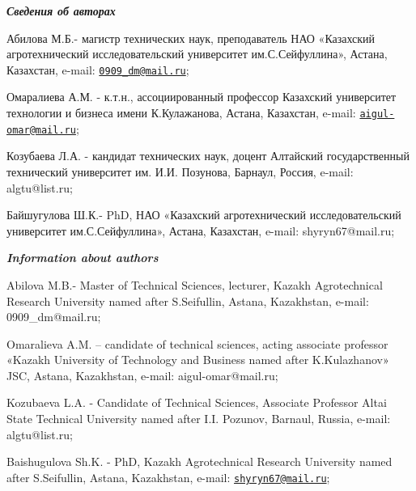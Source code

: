 \emph{{\bfseries Сведения об авторах}}

Абилова М.Б.- магистр технических наук, преподаватель НАО «Казахский
агротехнический исследовательский университет им.С.Сейфуллина», Астана,
Казахстан, e-mail:
\href{mailto:0909_dm@mail.ru}{\nolinkurl{0909\_dm@mail.ru}};

Омаралиева А.М. - к.т.н., ассоциированный профессор Казахский
университет технологии и бизнеса имени К.Кулажанова, Астана, Казахстан,
e-mail:
\href{mailto:aigul-omar@mail.ru}{\nolinkurl{aigul-omar@mail.ru}};

Козубаева Л.А. - кандидат технических наук, доцент Алтайский
государственный технический университет им. И.И. Позунова, Барнаул,
Россия, e-mail: algtu@list.ru;

Байшугулова Ш.К.- PhD, НАО «Казахский агротехнический исследовательский
университет им.С.Сейфуллина», Астана, Казахстан, e-mail:
shyryn67@mail.ru;

\emph{{\bfseries Information about authors}}

Abilova M.B.- Master of Technical Sciences, lecturer, Kazakh
Agrotechnical Research University named after S.Seifullin, Astana,
Kazakhstan, e-mail: 0909\_dm@mail.ru;

Omaralieva A.M. -- candidate of technical sciences, acting associate
professor «Kazakh University of Technology and Business named after
K.Kulazhanov» JSC, Astana, Kazakhstan, e-mail: aigul-omar@mail.ru;

Kozubaeva L.A. - Candidate of Technical Sciences, Associate Professor
Altai State Technical University named after I.I. Pozunov, Barnaul,
Russia, e-mail: algtu@list.ru;

Baishugulova Sh.K. - PhD, Kazakh Agrotechnical Research University named
after S.Seifullin, Astana, Kazakhstan, e-mail:
\href{mailto:shyryn67@mail.ru}{\nolinkurl{shyryn67@mail.ru}};